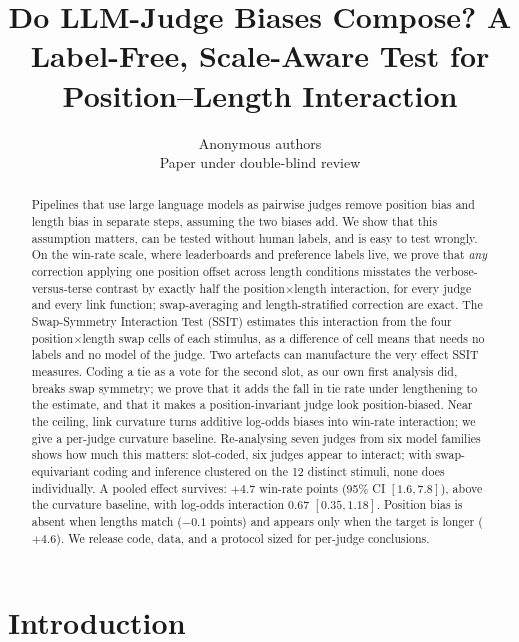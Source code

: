 \documentclass[10pt]{article}
\title{Do LLM-Judge Biases Compose? A Label-Free, Scale-Aware Test for Position--Length Interaction}
\author{\name Anonymous authors \\ \addr Paper under double-blind review}
\theoremstyle{remark}
\begin{document}
\maketitle

\begin{abstract}
Pipelines that use large language models as pairwise judges remove
position bias and length bias in separate steps, assuming the two biases
add. We show that this assumption matters, can be tested without human
labels, and is easy to test wrongly. On the win-rate scale, where
leaderboards and preference labels live, we prove that \emph{any}
correction applying one position offset across length conditions
misstates the verbose-versus-terse contrast by exactly half the
position$\times$length interaction, for every judge and every link
function; swap-averaging and length-stratified correction are exact. The
Swap-Symmetry Interaction Test (SSIT) estimates this interaction from
the four position$\times$length swap cells of each stimulus, as a
difference of cell means that needs no labels and no model of the
judge. Two artefacts can manufacture the very effect SSIT measures.
Coding a tie as a vote for the second slot, as our own first analysis
did, breaks swap symmetry; we prove that it adds the fall in tie rate
under lengthening to the estimate, and that it makes a position-invariant
judge look position-biased. Near the ceiling, link curvature turns
additive log-odds biases into win-rate interaction; we give a per-judge
curvature baseline. Re-analysing seven judges from six model families
shows how much this matters: slot-coded, six judges appear to interact;
with swap-equivariant coding and inference clustered on the 12 distinct
stimuli, none does individually. A pooled effect survives:
$+4.7$ win-rate points (95\% CI $[1.6, 7.8]$), above the curvature
baseline, with log-odds interaction $0.67$ $[0.35, 1.18]$. Position
bias is absent when lengths match ($-0.1$ points) and appears only when
the target is longer ($+4.6$). We release code, data, and a protocol
sized for per-judge conclusions.
\end{abstract}

\section{Introduction}
\label{sec:intro}
\end{document}
